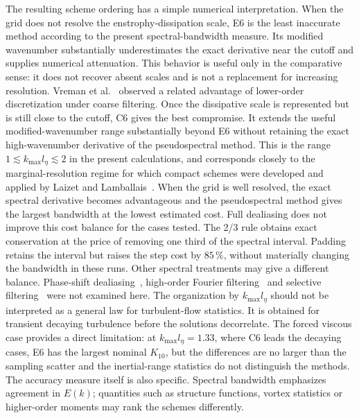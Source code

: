 \documentclass[11pt,a4paper]{article}
\begin{document}
The resulting scheme ordering has a simple numerical interpretation. When the grid does not resolve the enstrophy-dissipation scale, E6 is the least inaccurate method according to the present spectral-bandwidth measure. Its modified wavenumber substantially underestimates the exact derivative near the cutoff and supplies numerical attenuation. This behavior is useful only in the comparative sense: it does not recover absent scales and is not a replacement for increasing resolution. Vreman et al.~\cite{vreman1996} observed a related advantage of lower-order discretization under coarse filtering.
Once the dissipative scale is represented but is still close to the cutoff, C6 gives the best compromise. It extends the useful modified-wavenumber range substantially beyond E6 without retaining the exact high-wavenumber derivative of the pseudospectral method. This is the range $1\lesssim k_{\max}l_\eta\lesssim2$ in the present calculations, and corresponds closely to the marginal-resolution regime for which compact schemes were developed and applied by Laizet and Lamballais~\cite{laizet2009}. When the grid is well resolved, the exact spectral derivative becomes advantageous and the pseudospectral method gives the largest bandwidth at the lowest estimated cost.
Full dealiasing does not improve this cost balance for the cases tested. The 2/3 rule obtains exact conservation at the price of removing one third of the spectral interval. Padding retains the interval but raises the step cost by $85\,\%$, without materially changing the bandwidth in these runs. Other spectral treatments may give a different balance. Phase-shift dealiasing~\cite{lambert2026}, high-order Fourier filtering~\cite{hou2007} and selective filtering~\cite{yamamoto2026} were not examined here.
The organization by $k_{\max}l_\eta$ should not be interpreted as a general law for turbulent-flow statistics. It is obtained for transient decaying turbulence before the solutions decorrelate. The forced viscous case provides a direct limitation: at $k_{\max}l_\eta=1.33$, where C6 leads the decaying cases, E6 has the largest nominal $K_{10}$, but the differences are no larger than the sampling scatter and the inertial-range statistics do not distinguish the methods. The accuracy measure itself is also specific. Spectral bandwidth emphasizes agreement in $E(k)$; quantities such as structure functions, vortex statistics or higher-order moments may rank the schemes differently.
\end{document}
